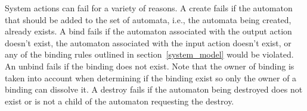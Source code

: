 System actions can fail for a variety of reasons.
A create fails if the automaton that should be added to the set of automata, i.e., the automata being created, already exists.
A bind fails if the automaton associated with the output action doesn't exist, the automaton associated with the input action doesn't exist, or any of the binding rules outlined in section~\ref{system_model} would be violated.
An unbind fails if the binding does not exist.
Note that the owner of binding is taken into account when determining if the binding exist so only the owner of a binding can dissolve it.
A destroy fails if the automaton being destroyed does not exist or is not a child of the automaton requesting the destroy.

